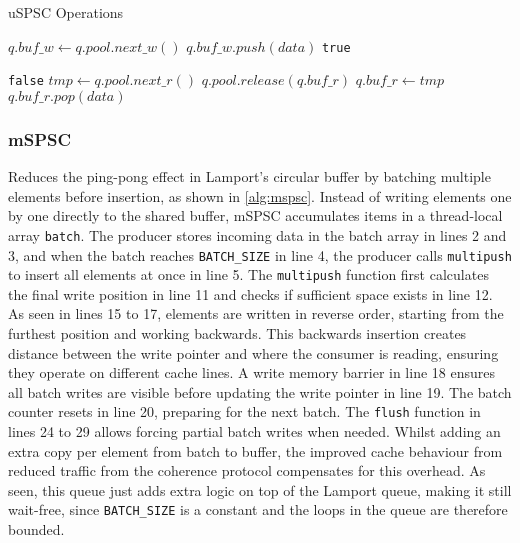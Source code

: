 \begin{algorithm}[!ht]
    \centering
    \captionsetup{justification=centering}
    \caption{\ac{uSPSC} Operations\cite{torquati2010singleproducersingleconsumerqueuessharedcache}}
    \label{alg:uspsc}
    \scriptsize
    \begin{algorithmic}[1]
             
                \State $q.buf\_w \gets q.pool.next\_w()$ 
            \EndIf
            \State $q.buf\_w.push(data)$
            \State \Return \texttt{true}
        \EndFunction
        
        \State
        
                 
                    \State \Return \texttt{false} 
                \EndIf
                 
                    \State $tmp \gets q.pool.next\_r()$
                    \State $q.pool.release(q.buf\_r)$ 
                    \State $q.buf\_r \gets tmp$
                \EndIf
            \EndIf
            \State \Return $q.buf\_r.pop(data)$
        \EndFunction
    \end{algorithmic}
\end{algorithm}

\subsubsection{\acf{mSPSC}}
Reduces the ping-pong effect in Lamport's circular buffer by batching multiple elements before insertion, as shown in \cref{alg:mspsc}. Instead of writing elements one by one directly to the shared buffer, \ac{mSPSC} accumulates items in a thread-local array \texttt{batch}. The producer stores incoming data in the batch array in lines 2 and 3, and when the batch reaches \texttt{BATCH\_SIZE} in line 4, the producer calls \texttt{multipush} to insert all elements at once in line 5. The \texttt{multipush} function first calculates the final write position in line 11 and checks if sufficient space exists in line 12. As seen in lines 15 to 17, elements are written in reverse order, starting from the furthest position and working backwards. This backwards insertion creates distance between the write pointer and where the consumer is reading, ensuring they operate on different cache lines. A write memory barrier in line 18 ensures all batch writes are visible before updating the write pointer in line 19. The batch counter resets in line 20, preparing for the next batch. The \texttt{flush} function in lines 24 to 29 allows forcing partial batch writes when needed. Whilst adding an extra copy per element from batch to buffer, the improved cache behaviour from reduced traffic from the coherence protocol compensates for this overhead. As seen, this queue just adds extra logic on top of the Lamport queue, making it still wait-free, since \texttt{BATCH\_SIZE} is a constant and the loops in the queue are therefore bounded. \cite{torquati2010singleproducersingleconsumerqueuessharedcache}

